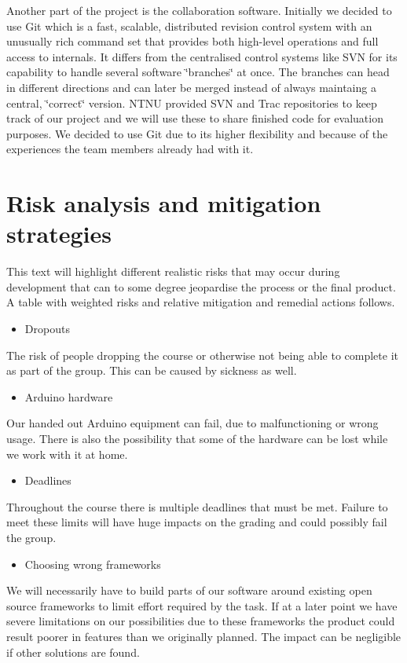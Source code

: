 Another part of the project is the collaboration software.
Initially we decided to use Git which is a fast, scalable,
distributed revision control system with an unusually rich command
set that provides both high-level operations and full access to internals.
It differs from the centralised control systems like SVN for its capability
to handle several software \char`\"{}branches\char`\"{} at once. The
branches can head in different directions and can later be merged
instead of always maintaing a central, \char`\"{}correct\char`\"{}
version. NTNU provided SVN and Trac repositories to keep track of our
project and we will use these to share finished code for evaluation
purposes. We decided to use Git due to its higher flexibility and because
of the experiences the team members already had with it.

\newpage
\section{Risk analysis and mitigation strategies}

This text will highlight different realistic risks that may occur during development
that can to some degree jeopardise the process or the final product.
A table with weighted risks and relative mitigation and remedial actions follows.

\begin{itemize}
\item Dropouts
\end{itemize}
The risk of people dropping the course or otherwise not being able to complete it as part
of the group. This can be caused by sickness as well.

\begin{itemize}
\item Arduino hardware
\end{itemize}
Our handed out Arduino equipment can fail, due to malfunctioning or wrong usage.
There is also the possibility that some of the hardware can be lost while we work with it at home.

\begin{itemize}
\item Deadlines
\end{itemize}
Throughout the course there is multiple deadlines that must be met. Failure to meet
these limits will have huge impacts on the grading and could possibly fail the group.

\begin{itemize}
\item Choosing wrong frameworks
\end{itemize}
We will necessarily have to build parts of our software around existing open source
frameworks to limit effort required by the task. If at a later point we have severe limitations
on our possibilities due to these frameworks the product could result poorer in features than
we originally planned. The impact can be negligible if other solutions are found.

